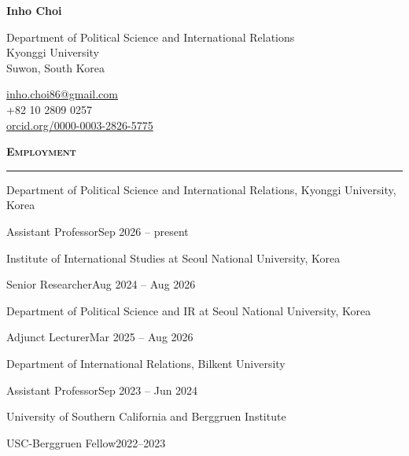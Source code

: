 \documentclass[11pt]{article}
\newcommand{\cvsection}[1]{%
  \vspace{1.0em}%
  {\bfseries\scshape #1}\par
  \vspace{0.25em}\hrule height 0.5pt\vspace{0.7em}}
\newcommand{\dated}[2]{#1\hfill #2\par}
\newenvironment{roles}{\vspace{0.15em}\begin{list}{}{%
  \setlength{\leftmargin}{1.5em}\setlength{\itemsep}{0pt}%
  \setlength{\parsep}{0pt}\setlength{\topsep}{0pt}}\item[]}{\end{list}}
\begin{document}
\begin{center}
  {\LARGE\bfseries Inho Choi}
\end{center}
\vspace{0.7em}

\begin{minipage}[t]{0.56\textwidth}
Department of Political Science and International Relations\\
Kyonggi University\\
Suwon, South Korea
\end{minipage}%
\begin{minipage}[t]{0.44\textwidth}
\raggedleft
\href{mailto:inho.choi86@gmail.com}{inho.choi86@gmail.com}\\
+82 10 2809 0257\\
\href{https://orcid.org/0000-0003-2826-5775}{orcid.org/0000-0003-2826-5775}
\end{minipage}

\cvsection{Employment}

Department of Political Science and International Relations, Kyonggi University, Korea
\begin{roles}\dated{Assistant Professor}{Sep 2026 -- present}\end{roles}

\vspace{0.45em}
Institute of International Studies at Seoul National University, Korea
\begin{roles}\dated{Senior Researcher}{Aug 2024 -- Aug 2026}\end{roles}

\vspace{0.45em}
Department of Political Science and IR at Seoul National University, Korea
\begin{roles}\dated{Adjunct Lecturer}{Mar 2025 -- Aug 2026}\end{roles}

\vspace{0.45em}
Department of International Relations, Bilkent University
\begin{roles}\dated{Assistant Professor}{Sep 2023 -- Jun 2024}\end{roles}

\vspace{0.45em}
University of Southern California and Berggruen Institute
\begin{roles}\dated{USC-Berggruen Fellow}{2022--2023}\end{roles}
\end{document}
